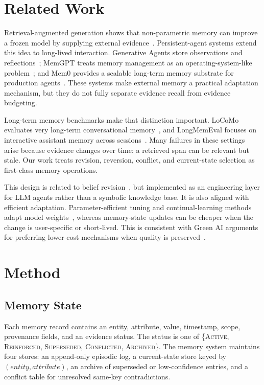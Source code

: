 \documentclass{article}
\begin{document}
\section{Related Work}

Retrieval-augmented generation shows that non-parametric memory can improve a frozen model by supplying external evidence~\cite{lewis2020rag}. Persistent-agent systems extend this idea to long-lived interaction. Generative Agents store observations and reflections~\cite{park2023generative}; MemGPT treats memory management as an operating-system-like problem~\cite{packer2023memgpt}; and Mem0 provides a scalable long-term memory substrate for production agents~\cite{chhikara2025mem0}. These systems make external memory a practical adaptation mechanism, but they do not fully separate evidence recall from evidence budgeting.

Long-term memory benchmarks make that distinction important. LoCoMo evaluates very long-term conversational memory~\cite{maharana2024locomo}, and LongMemEval focuses on interactive assistant memory across sessions~\cite{wu2025longmemeval}. Many failures in these settings arise because evidence changes over time: a retrieved span can be relevant but stale. Our work treats revision, reversion, conflict, and current-state selection as first-class memory operations.

This design is related to belief revision~\cite{alchourron1985logic}, but implemented as an engineering layer for LLM agents rather than a symbolic knowledge base. It is also aligned with efficient adaptation. Parameter-efficient tuning and continual-learning methods adapt model weights~\cite{hu2022lora,wang2024comprehensive}, whereas memory-state updates can be cheaper when the change is user-specific or short-lived. This is consistent with Green AI arguments for preferring lower-cost mechanisms when quality is preserved~\cite{strubell2019energy,schwartz2020green}.

\section{Method}

\subsection{Memory State}

Each memory record contains an entity, attribute, value, timestamp, scope, provenance fields, and an evidence status. The status is one of \{\textsc{Active}, \textsc{Reinforced}, \textsc{Superseded}, \textsc{Conflicted}, \textsc{Archived}\}. The memory system maintains four stores: an append-only episodic log, a current-state store keyed by $(\textit{entity}, \textit{attribute})$, an archive of superseded or low-confidence entries, and a conflict table for unresolved same-key contradictions.
\end{document}
